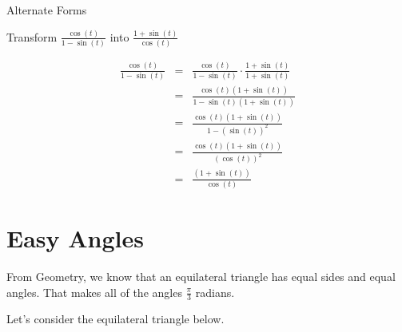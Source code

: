 \documentclass{ximera}
\begin{document}
\begin{example} Alternate Forms


Transform $\frac{\cos(t)}{1 - \sin(t)}$ into $\frac{1 + \sin(t)}{\cos(t)}$



\begin{explanation}

\begin{align*}
\frac{\cos(t)}{1 - \sin(t)}  &  = &  \frac{\cos(t)}{1 - \sin(t)}  \cdot \frac{1 + \sin(t)}{1 + \sin(t)}  \\
                           &  = &  \frac{\cos(t)(1 + \sin(t))}{1 - \sin(t)(1 + \sin(t))}  \\
                           &  = &  \frac{\cos(t)(1 + \sin(t))}{1 - (\sin(t))^2}  \\
                           &  = &  \frac{\cos(t)(1 + \sin(t))}{(\cos(t))^2}  \\
                           &  = &  \frac{(1 + \sin(t))}{\cos(t)}  
\end{align*}



\end{explanation}




\end{example}










\section{Easy Angles}


From Geometry, we know that an equilateral triangle has equal sides and equal angles.  That makes all of the angles $\frac{\pi}{3}$ radians.  

Let's consider the equilateral triangle below.
\end{document}
